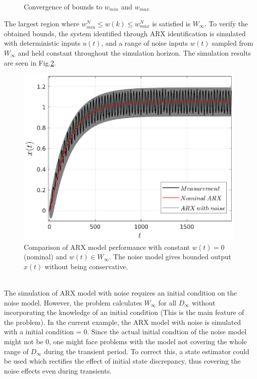 \documentclass[letterpaper, 10 pt, conference]{ieeeconf}  %
\begin{document}
\begin{enumerate}
\begin{figure}[h]
		\caption{Convergence of bounds to $w_{min}$ and $w_{max}$}
		\label{bounds}
	\end{figure} 
	The largest region where $w^N_{min} \leq w(k) \leq w^N_{max}$ is satisfied is $W_{\infty}$. To verify the obtained bounds, the system identified through ARX identification is simulated with deterministic inputs $u(t)$, and a range of noise inputs $w(t)$ sampled from $W_{\infty}$ and held constant throughout the simulation horizon. The simulation results are seen in Fig.\ref{simulation}.
	\begin{figure}[h]
		\includegraphics[scale = 0.65]{simulation.eps}
		\caption{Comparison of ARX model performance with constant $w(t)=0$(nominal) and $w(t)\in W_{\infty}$. The noise model gives bounded output $x(t)$ without being conservative.}
		\label{simulation}
	\end{figure} \\
	The simulation of ARX model with noise requires an initial condition on the noise model. However, the problem calculates $W_{\infty}$ for all $D_{\infty}$ without incorporating the knowledge of an initial condition (This is the main feature of the problem). In the current example, the ARX model with noise is simulated with a initial condition = $0$. Since the actual initial condtion of the noise model might not be $0$, one might face problems with the model not covering the whole range of $D_{\infty}$ during the transient period. To correct this, a state estimator could be used which rectifies the effect of initial state discrepancy, thus covering the noise effects even during transients.

\end{enumerate}
\end{document}
